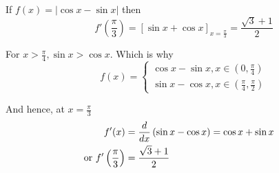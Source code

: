 \documentclass[14pt,fleqn]{extarticle}
\begin{document}
 
\begin{snippet}
    \correct
    
    If $f(x) = \vert \cos x - \sin x\vert$ then 
    \[ \quad f' \left(\frac{\pi}{3} \right) = \left[\sin x + \cos x \right]_{x = \frac{\pi}{3}} = \frac{\sqrt{3}+1}{2} \]
    
    \reason
    
    For $x > \frac\pi{4}, \sin x > \cos x$. Which is why 
    \[ \quad f(x) = \begin{cases} 
    \cos x - \sin x, x \in \left(0, \frac\pi{4} \right) \\
    \sin x - \cos x, x \in \left(\frac\pi{4}, \frac\pi{2} \right)
    \end{cases} \]
    
    And hence, at $x = \frac{\pi}{3}$ 
    \begin{align}
	f'(x) &= \frac{d}{dx} \left(\sin x-\cos x \right) = \cos x + \sin x\\
	\text{or } f' \left(\frac\pi{3} \right) &= \frac{\sqrt{3} + 1}{2}
\end{align}
    
\end{snippet} 
\end{document}
